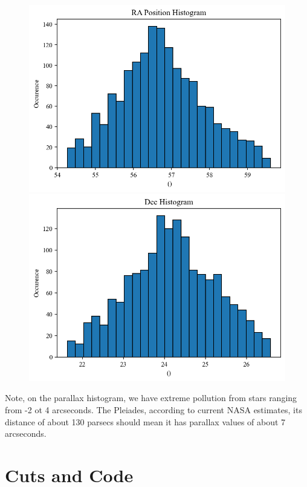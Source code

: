 \documentclass{article}
\begin{document}
\begin{figure}[H]
    \includegraphics[scale = .5]{Figure 2025-02-08 230950 (4).png}
    \includegraphics[scale = .5]{Figure 2025-02-08 230950 (5).png}
\end{figure}

Note, on the parallax histogram, we have extreme pollution from stars ranging from -2 ot 4 arcseconds.
The Pleiades, according to current NASA estimates, its distance of about 130 parsecs should mean it has parallax values of about 7 arcseconds.

\section{Cuts and Code}
\end{document}

